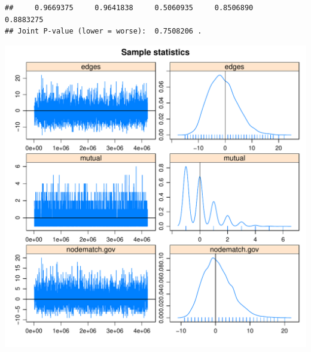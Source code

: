 \documentclass[12pt, letterpaper, notitlepage, onecolumn, twoside, openbib]{article}\usepackage[]{graphicx}\usepackage[]{color}
\makeatletter
\def\maxwidth{ %
  \ifdim\Gin@nat@width>\linewidth
    \linewidth
  \else
    \Gin@nat@width
  \fi
}
\newenvironment{kframe}{%
 \def\at@end@of@kframe{}%
 \ifinner\ifhmode%
  \def\at@end@of@kframe{\end{minipage}}%
  \begin{minipage}{\columnwidth}%
 \fi\fi%
 \def\FrameCommand##1{\hskip\@totalleftmargin \hskip-\fboxsep
 \colorbox{shadecolor}{##1}\hskip-\fboxsep
     \hskip-\linewidth \hskip-\@totalleftmargin \hskip\columnwidth}%
 \MakeFramed {\advance\hsize-\width
   \@totalleftmargin\z@ \linewidth\hsize
   \@setminipage}}%
 {\par\unskip\endMakeFramed%
 \at@end@of@kframe}
\newenvironment{knitrout}{}{} %
\makeatother
\begin{document}
\begin{knitrout}
\begin{kframe}
\begin{verbatim}
##     0.9669375     0.9641838     0.5060935     0.8506890     0.8883275 
## Joint P-value (lower = worse):  0.7508206 .
\end{verbatim}
\end{kframe}
\includegraphics[width=\maxwidth]{figure/unnamed-chunk-9-1} 


\end{knitrout}
\end{document}
